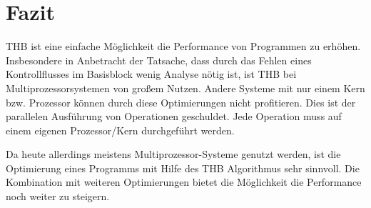 \chapter{Fazit}
\ac{THB} ist eine einfache Möglichkeit die Performance von Programmen zu erhöhen. Insbesondere in Anbetracht der Tatsache, dass durch das Fehlen eines Kontrollflusses im Basisblock wenig Analyse nötig ist, ist \ac{THB} bei Multiprozessorsystemen von großem Nutzen. Andere Systeme mit nur einem Kern bzw. Prozessor können durch diese Optimierungen nicht profitieren. Dies ist der parallelen Ausführung von Operationen geschuldet. Jede Operation muss auf einem eigenen Prozessor/Kern durchgeführt werden.

Da heute allerdings meistens Multiprozessor-Systeme genutzt werden, ist die Optimierung eines Programms mit Hilfe des \ac{THB} Algorithmus sehr sinnvoll. Die Kombination mit weiteren Optimierungen bietet die Möglichkeit die Performance noch weiter zu steigern.

